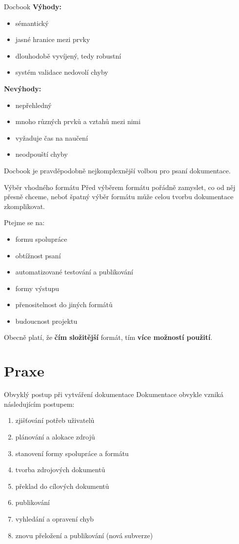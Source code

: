 \documentclass[12pt,a4paper]{beamer}
\begin{document}
	\begin{frame}{Docbook}
	\textbf{Výhody:}
	\begin{itemize}
		\item sémantický
		\item jasné hranice mezi prvky
		\item dlouhodobě vyvíjený, tedy robustní
		\item systém validace nedovolí chyby
	\end{itemize}	
	\textbf{Nevýhody:}
	\begin{itemize}
		\item nepřehledný
		\item mnoho různých prvků a vztahů mezi nimi
		\item vyžaduje čas na naučení
		\item neodpouští chyby
	\end{itemize}				
	Docbook je pravděpodobně nejkomplexnější volbou pro psaní dokumentace.
	\end{frame}

	\begin{frame}{Výběr vhodného formátu}
	Před výběrem formátu pořádně zamyslet, co od něj přesně chceme, neboť špatný výběr formátu může celou tvorbu dokumentace zkomplikovat.

	Ptejme se na:
	
	\begin{itemize}
		\item formu spolupráce
		\item obtížnost psaní
		\item automatizované testování a publikování
		\item formy výstupu
		\item přenositelnost do jiných formátů
		\item budoucnost projektu
	\end{itemize}
	Obecně platí, že \textbf{čím složitější} formát, tím \textbf{více možností použití}.
	\end{frame}

	\section{Praxe}	

	\begin{frame}{Obvyklý postup při vytváření dokumentace}
	Dokumentace obvykle vzniká následujícím postupem:
			\begin{enumerate}
				\item zjišťování potřeb uživatelů
				\item plánování a alokace zdrojů
				\item stanovení formy spolupráce a formátu
				\item tvorba zdrojových dokumentů
				\item překlad do cílových dokumentů
				\item publikování
				\item vyhledání a opravení chyb
				\item znovu přeložení a publikování (nová subverze)
			\end{enumerate}
	\end{frame}
\end{document}
